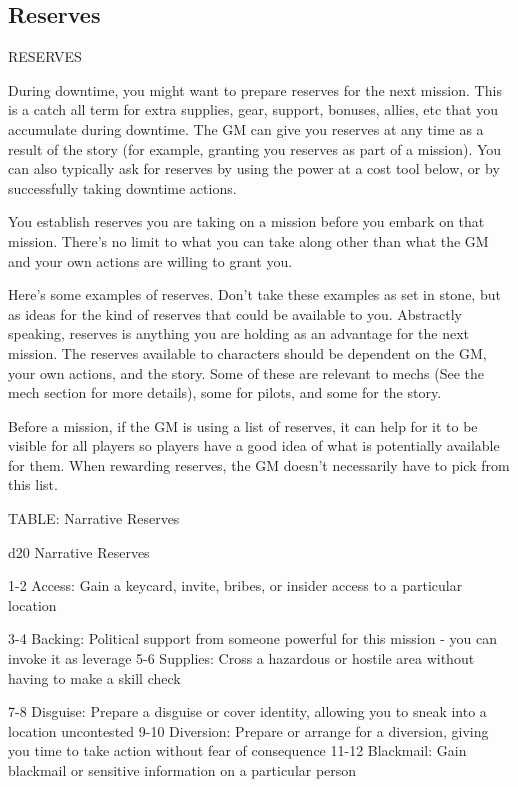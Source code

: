 \subsection{Reserves}
                                                 RESERVES

During downtime, you might want to prepare reserves for the next mission. This is a catch all
term for extra supplies, gear, support, bonuses, allies, etc that you accumulate during downtime.
The GM can give you reserves at any time as a result of the story (for example, granting you
reserves as part of a mission). You can also typically ask for reserves by using the power at a
cost tool below, or by successfully taking downtime actions.


You establish reserves you are taking on a mission before you embark on that mission. There’s
no limit to what you can take along other than what the GM and your own actions are willing to
grant you.


Here’s some examples of reserves. Don’t take these examples as set in stone, but as ideas for
the kind of reserves that could be available to you. Abstractly speaking, reserves is anything
you are holding as an advantage for the next mission. The reserves available to characters
should be dependent on the GM, your own actions, and the story. Some of these are relevant to
mechs (See the mech section for more details), some for pilots, and some for the story.


Before a mission, if the GM is using a list of reserves, it can help for it to be visible for all
players so players have a good idea of what is potentially available for them. When rewarding
reserves, the GM doesn’t necessarily have to pick from this list.


TABLE: Narrative Reserves




 d20       Narrative	Reserves

  1-2      Access: Gain a keycard, invite, bribes, or insider access to a particular location

  3-4      Backing: Political support from someone powerful for this mission - you can invoke it
           as leverage
  5-6      Supplies: Cross a hazardous or hostile area without having to make a skill check

  7-8      Disguise: Prepare a disguise or cover identity, allowing you to sneak into a location
           uncontested
 9-10      Diversion: Prepare or arrange for a diversion, giving you time to take action without
           fear of consequence
   11-12   Blackmail: Gain blackmail or sensitive information on a particular person

